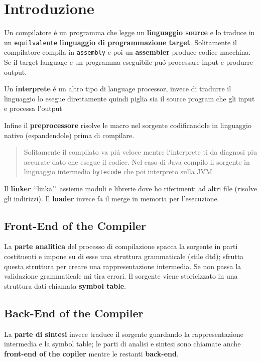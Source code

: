 \chapter{Introduzione}
Un compilatore \'e un programma che legge un \textbf{linguaggio source} e lo traduce in un \texttt{equilvalente} \textbf{linguaggio di programmazione
target}. 
Solitamente il compilatore compila in \texttt{assembly} e poi un \textbf{assembler} produce codice macchina.
Se il target language e un programma eseguibile pu\'o processare input e produrre output.

Un \textbf{interprete} \'e un altro tipo di language processor, invece di tradurre il linguaggio lo esegue direttamente
quindi piglia sia il source program che gli input e processa l'output

Infine il \textbf{preprocessore} risolve le macro nel sorgente codificandole in linguaggio nativo (espandendole) prima di compilare.

\begin{quote}
Solitamente il compilato va pi\'u veloce mentre l`interprete ti da diagnosi piu accurate dato che esegue il codice.
Nel caso di Java compilo il sorgente in linguaggio intermedio \texttt{bytecode} che poi interpreto sulla JVM.
\end{quote}

Il \textbf{linker} \lq\lq linka\rq\rq\ assieme moduli e librerie dove ho riferimenti ad altri file (risolve gli indirizzi).
Il \textbf{loader} invece fa il merge in memoria per l'esecuzione.


\section{Front-End of the Compiler}
La \textbf{parte analitica} del processo di compilazione spacca la sorgente in parti costituenti e impone su di esse una struttura 
grammaticale (stile dtd); sfrutta questa struttura per creare una rappresentazione intermedia.
Se non passa la validazione grammaticale mi tira errori. Il sorgente viene storicizzato in
una struttura dati chiamata \textbf{symbol table}. 

\section{Back-End of the Compiler}
La \textbf{parte di sintesi} invece traduce il sorgente guardando la rappresentazione intermedia e la symbol table;
le parti di analisi e sintesi sono chiamate anche \textbf{front-end of the copiler} mentre le restanti \textbf{back-end}.

